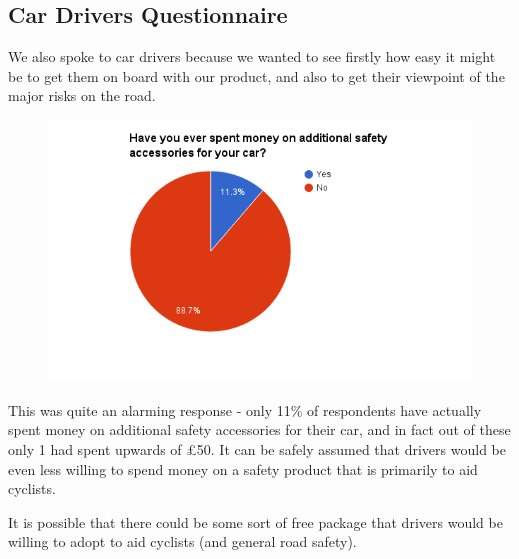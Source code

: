\documentclass[a4paper]{report}
\begin{document}
{\subsection{Car Drivers Questionnaire}
We also spoke to car drivers because we wanted to see firstly how easy it might be to get them on board with our product, and also to get their viewpoint of the major risks on the road.
\begin{figure}[H]
\centering
\includegraphics[scale=0.6]{figures/research_report/questionnaires/cars_1}
\end{figure}
This was quite an alarming response - only 11\% of respondents have actually spent money on additional safety accessories for their car, and in fact out of these only 1 had spent upwards of \pounds50. It can be safely assumed that drivers would be even less willing to spend money on a safety product that is primarily to aid cyclists.

It is possible that there could be some sort of free package that drivers would be willing to adopt to aid cyclists (and general road safety).

}
\end{document}
